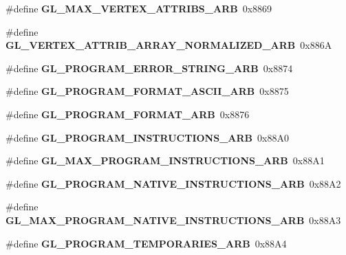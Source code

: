 \begin{DoxyCompactItemize}
\item 
\#define {\bfseries G\+L\+\_\+\+M\+A\+X\+\_\+\+V\+E\+R\+T\+E\+X\+\_\+\+A\+T\+T\+R\+I\+B\+S\+\_\+\+A\+R\+B}~0x8869\label{_s_d_l__opengl_8h_a7642f207f5b952cce8859efa6ad03a81}

\item 
\#define {\bfseries G\+L\+\_\+\+V\+E\+R\+T\+E\+X\+\_\+\+A\+T\+T\+R\+I\+B\+\_\+\+A\+R\+R\+A\+Y\+\_\+\+N\+O\+R\+M\+A\+L\+I\+Z\+E\+D\+\_\+\+A\+R\+B}~0x886\+A\label{_s_d_l__opengl_8h_ac3e2ea329d1a48983a1c79865cbf844b}

\item 
\#define {\bfseries G\+L\+\_\+\+P\+R\+O\+G\+R\+A\+M\+\_\+\+E\+R\+R\+O\+R\+\_\+\+S\+T\+R\+I\+N\+G\+\_\+\+A\+R\+B}~0x8874\label{_s_d_l__opengl_8h_a3719377662041961e1f8e8798d35c0f5}

\item 
\#define {\bfseries G\+L\+\_\+\+P\+R\+O\+G\+R\+A\+M\+\_\+\+F\+O\+R\+M\+A\+T\+\_\+\+A\+S\+C\+I\+I\+\_\+\+A\+R\+B}~0x8875\label{_s_d_l__opengl_8h_a3548a6b472d63d5ee6647ae466990832}

\item 
\#define {\bfseries G\+L\+\_\+\+P\+R\+O\+G\+R\+A\+M\+\_\+\+F\+O\+R\+M\+A\+T\+\_\+\+A\+R\+B}~0x8876\label{_s_d_l__opengl_8h_abea9256878c64639634d8154cb956761}

\item 
\#define {\bfseries G\+L\+\_\+\+P\+R\+O\+G\+R\+A\+M\+\_\+\+I\+N\+S\+T\+R\+U\+C\+T\+I\+O\+N\+S\+\_\+\+A\+R\+B}~0x88\+A0\label{_s_d_l__opengl_8h_ab90f0275619b91635ecb72af642b11de}

\item 
\#define {\bfseries G\+L\+\_\+\+M\+A\+X\+\_\+\+P\+R\+O\+G\+R\+A\+M\+\_\+\+I\+N\+S\+T\+R\+U\+C\+T\+I\+O\+N\+S\+\_\+\+A\+R\+B}~0x88\+A1\label{_s_d_l__opengl_8h_ab0ff0e5866976191429bf1e3d5d95c9e}

\item 
\#define {\bfseries G\+L\+\_\+\+P\+R\+O\+G\+R\+A\+M\+\_\+\+N\+A\+T\+I\+V\+E\+\_\+\+I\+N\+S\+T\+R\+U\+C\+T\+I\+O\+N\+S\+\_\+\+A\+R\+B}~0x88\+A2\label{_s_d_l__opengl_8h_a4b0080664dee33231e1d4d2779fc817b}

\item 
\#define {\bfseries G\+L\+\_\+\+M\+A\+X\+\_\+\+P\+R\+O\+G\+R\+A\+M\+\_\+\+N\+A\+T\+I\+V\+E\+\_\+\+I\+N\+S\+T\+R\+U\+C\+T\+I\+O\+N\+S\+\_\+\+A\+R\+B}~0x88\+A3\label{_s_d_l__opengl_8h_a10979fc8d90b84bfcd8c1b25378992c5}

\item 
\#define {\bfseries G\+L\+\_\+\+P\+R\+O\+G\+R\+A\+M\+\_\+\+T\+E\+M\+P\+O\+R\+A\+R\+I\+E\+S\+\_\+\+A\+R\+B}~0x88\+A4\label{_s_d_l__opengl_8h_a5e669fd8030346042293a62a770e0bd2}


\end{DoxyCompactItemize}
